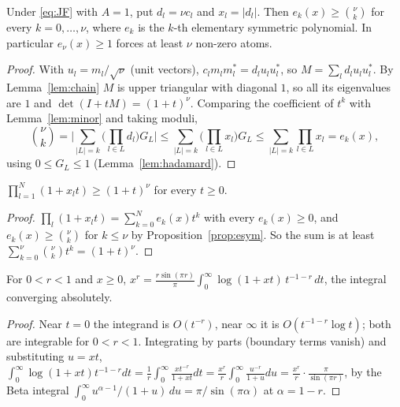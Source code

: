 \begin{proposition}
\label{prop:esym}
Under \eqref{eq:JF} with $A=1$, put $d_l=\nu c_l$ and $x_l=|d_l|$. Then $e_k(x)\ge\binom\nu k$ for every
$k=0,\dots,\nu$, where $e_k$ is the $k$-th elementary symmetric polynomial. In particular $e_\nu(x)\ge1$ forces
at least $\nu$ non-zero atoms.
\end{proposition}
\begin{proof}
With $u_l=m_l/\sqrt\nu$ (unit vectors), $c_lm_lm_l^*=d_lu_lu_l^*$, so $M=\sum_ld_lu_lu_l^*$. By
Lemma~\ref{lem:chain} $M$ is upper triangular with diagonal $1$, so all its eigenvalues are $1$ and
$\det(I+tM)=(1+t)^\nu$. Comparing the coefficient of $t^k$ with Lemma~\ref{lem:minor} and taking moduli,
\[
\binom\nu k=\Big|\sum_{|L|=k}\Big(\prod_{l\in L}d_l\Big)G_L\Big|\le\sum_{|L|=k}\Big(\prod_{l\in L}x_l\Big)G_L\le\sum_{|L|=k}\prod_{l\in L}x_l=e_k(x),
\]
using $0\le G_L\le1$ (Lemma~\ref{lem:hadamard}).
\end{proof}

\begin{proposition}
\label{prop:gen}
$\prod_{l=1}^N(1+x_lt)\ge(1+t)^\nu$ for every $t\ge0$.
\end{proposition}
\begin{proof}
$\prod_l(1+x_lt)=\sum_{k=0}^Ne_k(x)t^k$ with every $e_k(x)\ge0$, and $e_k(x)\ge\binom\nu k$ for $k\le\nu$ by
Proposition~\ref{prop:esym}. So the sum is at least $\sum_{k=0}^\nu\binom\nu kt^k=(1+t)^\nu$.
\end{proof}

\begin{lemma}
\label{lem:bernstein}
For $0<r<1$ and $x\ge0$, $x^r=\frac{r\sin(\pi r)}\pi\int_0^\infty\log(1+xt)\,t^{-1-r}\,dt$, the integral
converging absolutely.
\end{lemma}
\begin{proof}
Near $t=0$ the integrand is $O(t^{-r})$, near $\infty$ it is $O(t^{-1-r}\log t)$; both are integrable for
$0<r<1$. Integrating by parts (boundary terms vanish) and substituting $u=xt$,
$\int_0^\infty\log(1+xt)t^{-1-r}dt=\frac1r\int_0^\infty\frac{xt^{-r}}{1+xt}dt=\frac{x^r}r\int_0^\infty\frac{u^{-r}}{1+u}du=\frac{x^r}r\cdot\frac\pi{\sin(\pi r)}$,
by the Beta integral $\int_0^\infty u^{\alpha-1}/(1+u)\,du=\pi/\sin(\pi\alpha)$ at $\alpha=1-r$.
\end{proof}

